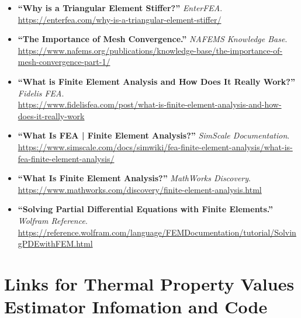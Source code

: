 \documentclass[11pt]{article}
\begin{document}
\begin{itemize}
    \item \textbf{``Why is a Triangular Element Stiffer?''} \textit{EnterFEA}. \\ 
    \url{https://enterfea.com/why-is-a-triangular-element-stiffer/}
    
    \item \textbf{``The Importance of Mesh Convergence.''} \textit{NAFEMS Knowledge Base}. \\ 
    \url{https://www.nafems.org/publications/knowledge-base/the-importance-of-mesh-convergence-part-1/}
    
    \item \textbf{``What is Finite Element Analysis and How Does It Really Work?''} \textit{Fidelis FEA}. \\ 
    \url{https://www.fidelisfea.com/post/what-is-finite-element-analysis-and-how-does-it-really-work}
    
    \item \textbf{``What Is FEA | Finite Element Analysis?''} \textit{SimScale Documentation}. \\ 
    \url{https://www.simscale.com/docs/simwiki/fea-finite-element-analysis/what-is-fea-finite-element-analysis/}
    
    \item \textbf{``What Is Finite Element Analysis?''} \textit{MathWorks Discovery}. \\ 
    \url{https://www.mathworks.com/discovery/finite-element-analysis.html}
    
    \item \textbf{``Solving Partial Differential Equations with Finite Elements.''} \textit{Wolfram Reference}. \\ 
    \url{https://reference.wolfram.com/language/FEMDocumentation/tutorial/SolvingPDEwithFEM.html}
\end{itemize}

\section*{Links for Thermal Property Values Estimator Infomation and Code}
\end{document}
